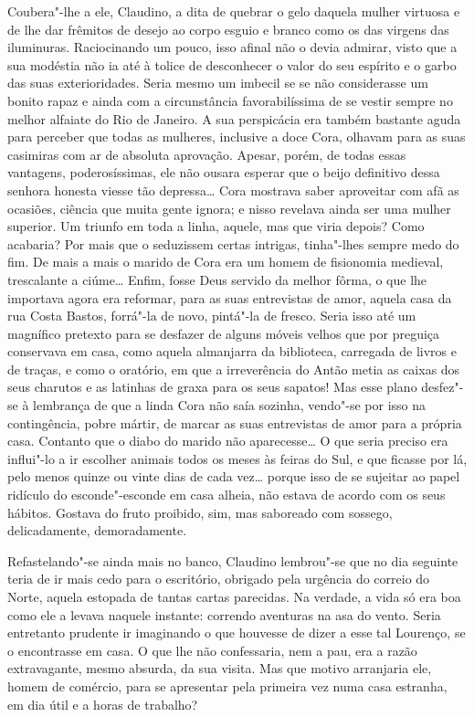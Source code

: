 Coubera"-lhe a ele, Claudino, a dita de quebrar o gelo daquela mulher
virtuosa e de lhe dar frêmitos de desejo ao corpo esguio e branco como
os das virgens das iluminuras. Raciocinando um pouco, isso afinal não o
devia admirar, visto que a sua modéstia não ia até à tolice de
desconhecer o valor do seu espírito e o garbo das suas exterioridades.
Seria mesmo um imbecil se se não considerasse um bonito rapaz e ainda
com a circunstância favorabilíssima de se vestir sempre no melhor
alfaiate do Rio de Janeiro. A sua perspicácia era também bastante aguda
para perceber que todas as mulheres, inclusive a doce Cora, olhavam para
as suas casimiras com ar de absoluta aprovação. Apesar, porém, de todas
essas vantagens, poderosíssimas, ele não ousara esperar que o beijo
definitivo dessa senhora honesta viesse tão depressa\ldots{} Cora mostrava
saber aproveitar com afã as ocasiões, ciência que muita gente ignora; e
nisso revelava ainda ser uma mulher superior. Um triunfo em toda a
linha, aquele, mas que viria depois? Como acabaria? Por mais que o
seduzissem certas intrigas, tinha"-lhes sempre medo do fim. De mais a
mais o marido de Cora era um homem de fisionomia medieval, trescalante
a ciúme\ldots{} Enfim, fosse Deus servido da melhor fôrma, o que lhe
importava agora era reformar, para as suas entrevistas de amor, aquela
casa da rua Costa Bastos, forrá"-la de novo, pintá"-la de fresco. Seria
isso até um magnífico pretexto para se desfazer de alguns móveis velhos
que por preguiça conservava em casa, como aquela almanjarra da
biblioteca, carregada de livros e de traças, e como o oratório, em que a
irreverência do Antão metia as caixas dos seus charutos e as latinhas de
graxa para os seus sapatos! Mas esse plano desfez"-se à lembrança de que
a linda Cora não saía sozinha, vendo"-se por isso na contingência, pobre
mártir, de marcar as suas entrevistas de amor para a própria casa.
Contanto que o diabo do marido não aparecesse\ldots{} O que seria preciso era
influi"-lo a ir escolher animais todos os meses às feiras do Sul, e que
ficasse por lá, pelo menos quinze ou vinte dias de cada vez\ldots{} porque
isso de se sujeitar ao papel ridículo do esconde"-esconde em casa alheia,
não estava de acordo com os seus hábitos. Gostava do fruto proibido,
sim, mas saboreado com sossego, delicadamente, demoradamente.

Refastelando"-se ainda mais no banco, Claudino lembrou"-se que no dia
seguinte teria de ir mais cedo para o escritório, obrigado pela urgência
do correio do Norte, aquela estopada de tantas cartas parecidas. Na
verdade, a vida só era boa como ele a levava naquele instante: correndo
aventuras na asa do vento. Seria entretanto prudente ir imaginando o que
houvesse de dizer a esse tal Lourenço, se o encontrasse em casa. O que
lhe não confessaria, nem a pau, era a razão extravagante, mesmo absurda,
da sua visita. Mas que motivo arranjaria ele, homem de comércio, para se
apresentar pela primeira vez numa casa estranha, em dia útil e a horas
de trabalho?

